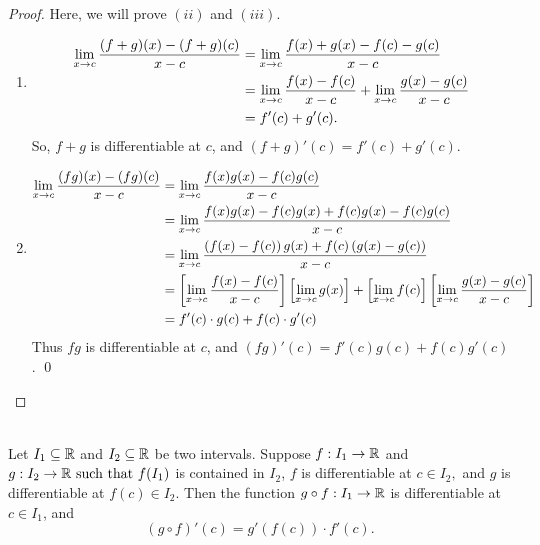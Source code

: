 \begin{proof}
    Here, we will prove $(ii)$ and $(iii)$.
    \begin{enumerate}[$(ii)$]
        \item \begin{align*}
            \lim \limits_{x \to c} \frac{(f+g)(x) - (f+g)(c)}{x-c} &= \lim \limits_{x \to c}\frac{f(x) + g(x) - f(c)-g(c)}{x - c} \\
            &= \lim \limits_{x \to c} \frac{f(x) - f(c)}{x-c} + \lim \limits_{x \to c} \frac{g(x) - g(c)}{x-c} \\
            &= f'(c) + g'(c).
        \end{align*}
        So, $f+g$ is differentiable at $c$, and $(f+g)'(c) = f'(c) + g'(c)$.
        
        \item \begin{align*}
            \lim \limits_{x \to c} \frac{(fg)(x) - (fg)(c)}{x-c} &= \lim \limits_{x \to c} \frac{f(x)g(x) - f(c)g(c)}{x - c} \\
            &= \lim \limits_{x \to c} \frac{f(x)g(x) - f(c)g(x) + f(c)g(x) - f(c)g(c)}{x - c} \\
            &= \lim \limits_{x \to c}\frac{\left(f(x)-f(c)\right)g(x) + f(c)\left(g(x)-g(c)\right)}{x-c} \\
            &=\left[\lim \limits_{x \to c} \frac{f(x) - f(c)}{x-c}\right]\left[\lim \limits_{x \to c}g(x)\right] + \left[\lim \limits_{x \to c}f(c)\right]\left[\lim \limits_{x \to c} \frac{g(x) - g(c)}{x-c}\right] \\
            &= f'(c) \cdot g(c) + f(c) \cdot g'(c)
        \end{align*}
        Thus $fg$ is differentiable at $c$, and $(fg)'(c) = f'(c)g(c) + f(c)g'(c)$. \qed
    \end{enumerate}
\end{proof}

\begin{theorem} \leavevmode\\
    \label{Thm5.5}
    Let $I_1 \subseteq \mathbb{R}$ and $I_2 \subseteq \mathbb{R}$ be two intervals. Suppose $f: I_1 \to \mathbb{R}$ and $g: I_2 \to \mathbb{R} \text{ such that } f(I_1)$ is contained in $I_2$, $f$ is differentiable at $c \in I_2,$ and $g$ is differentiable at $f(c) \in I_2$. Then the function $g\circ f: I_1 \to \mathbb{R}$ is differentiable at $c\in I_1$, and 
    $$
    (g \circ f)'(c) = g'(f(c)) \cdot f'(c).
    $$
\end{theorem}

